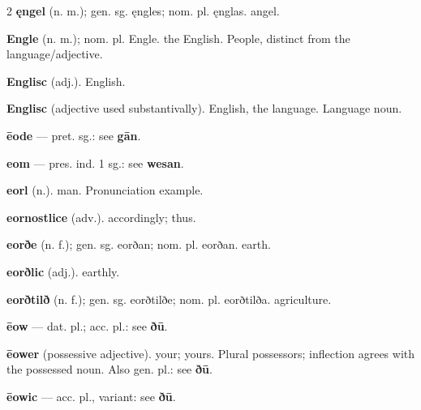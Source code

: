 \begin{multicols*}{2}
\textbf{ęngel} (n. m.); gen. sg. ęngles; nom. pl. ęnglas. angel.\par
\textbf{Engle} (n. m.); nom. pl. Engle. the English. People, distinct from the language/adjective.\par
\textbf{Englisc} (adj.). English.\par
\textbf{Englisc} (adjective used substantivally). English, the language. Language noun.\par
\textbf{ēode} — pret. sg.: see \textbf{gān}.\par
\textbf{eom} — pres. ind. 1 sg.: see \textbf{wesan}.\par
\textbf{eorl} (n.). man. Pronunciation example.\par
\textbf{eornostlice} (adv.). accordingly; thus.\par
\textbf{eorðe} (n. f.); gen. sg. eorðan; nom. pl. eorðan. earth.\par
\textbf{eorðlic} (adj.). earthly.\par
\textbf{eorðtilð} (n. f.); gen. sg. eorðtilðe; nom. pl. eorðtilða. agriculture.\par
\textbf{ēow} — dat. pl.; acc. pl.: see \textbf{ðū}.\par
\textbf{ēower} (possessive adjective). your; yours. Plural possessors; inflection agrees with the possessed noun. Also gen. pl.: see \textbf{ðū}.\par
\textbf{ēowic} — acc. pl., variant: see \textbf{ðū}.\par

\end{multicols*}
